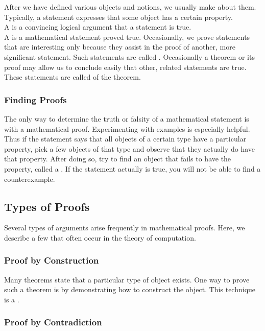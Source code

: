 \documentclass{article}
\begin{document}
After we have defined various objects and notions, we usually make  about them. Typically, a statement expresses that some object has a certain property. \\

A  is a convincing logical argument that a statement is true. \\ 

A  is a mathematical statement proved true. Occasionally, we prove statements that are interesting only because they assist in the proof of another, more significant statement. Such statements are called . Occasionally a theorem or its proof may allow us to conclude easily that other, related statements are true. These statements are called  of the theorem. 

\subsubsection{Finding Proofs}

The only way to determine the truth or falsity of a mathematical statement is with a mathematical proof. Experimenting with examples is especially helpful. Thus if the statement says that all objects of a certain type have a particular property, pick a few objects of that type and observe that they actually do have that property. After doing so, try to find an object that fails to have the property, called a . If the statement actually is true, you will not be able to find a counterexample. 

\subsection{Types of Proofs}
Several types of arguments arise frequently in mathematical proofs. Here, we describe a few that often occur in the theory of computation. 

\subsubsection{Proof by Construction}

Many theorems state that a particular type of object exists. One way to prove such a theorem is by demonstrating how to construct the object. This technique is a . 

\subsubsection{Proof by Contradiction}
\end{document}
